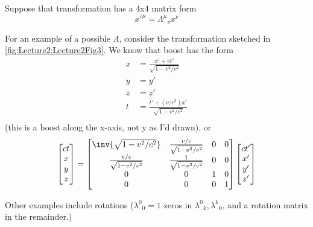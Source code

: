 Suppose that transformation has a 4x4 matrix form
\begin{equation}\label{eqn:qftLecture2:520}
{x'}^\mu = {\Lambda^\mu}_\nu x^\nu
\end{equation}

For an example of a possible \( \Lambda \), consider the transformation sketched in
\cref{fig:Lecture2:Lecture2Fig3}.
We know that boost has the form
\begin{equation}\label{eqn:qftLecture2:540}
\begin{aligned}
x &= \frac{x' + v t'}{\sqrt{1 - v^2/c^2}} \\
y &= y' \\
z &= z' \\
t &= \frac{t' + (v/c^2) x'}{\sqrt{1 - v^2/c^2}} \\
\end{aligned}
\end{equation}
(this is a boost along the x-axis, not y as I'd drawn),
or
\begin{equation}\label{eqn:qftLecture2:560}
\begin{bmatrix}
c t \\
x \\
y \\
z
\end{bmatrix}
=
\begin{bmatrix}
\inv{\sqrt{1 - v^2/c^2}} & \frac{v/c}{\sqrt{1 - v^2/c^2}} & 0 & 0 \\
\frac{v/c}{\sqrt{1 - v^2/c^2}} & \frac{1}{\sqrt{1 - v^2/c^2}} & 0 & 0 \\
0 & 0 & 1 & 0 \\
0 & 0 & 0 & 1 \\
\end{bmatrix}
\begin{bmatrix}
c t' \\
x' \\
y' \\
z'
\end{bmatrix}
\end{equation}

Other examples include rotations (\({\lambda^0}_0 = 1\) zeros in \( {\lambda^0}_k, {\lambda^k}_0 \), and a rotation matrix in the remainder.)

